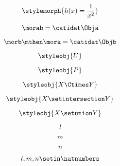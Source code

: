 \begin{forslides}
        \begin{equation}
            \label{eq:30}
            \stylemorph{h(x) = \frac{1}{x^2}}
        \end{equation}

        \begin{equation}
            \label{eq:31}
            \morab = \catidat\Obja
        \end{equation}

        \begin{equation}
            \label{eq:32}
            \morb \mthen \mora = \catidat\Objb
        \end{equation}

        \begin{equation}
            \label{eq:33}
            \styleobj{U}
        \end{equation}

        \begin{equation}
            \label{eq:34}
            \styleobj{P}
        \end{equation}

        \begin{equation}
            \label{eq:35}
            \styleobj{X \Ctimes Y}
        \end{equation}

        \begin{equation}
            \label{eq:36}
            \styleobj{X \setintersection Y}
        \end{equation}

        \begin{equation}
            \label{eq:37}
            \styleobj{X \setunion Y}
        \end{equation}

        \begin{equation}
            \label{eq:38}
            l
        \end{equation}

        \begin{equation}
            \label{eq:39}
            m
        \end{equation}

        \begin{equation}
            \label{eq:40}
            n
        \end{equation}

        \begin{equation}
            \label{eq:41}
            l, m, n \setin \natnumbers
        \end{equation}


\end{forslides}
